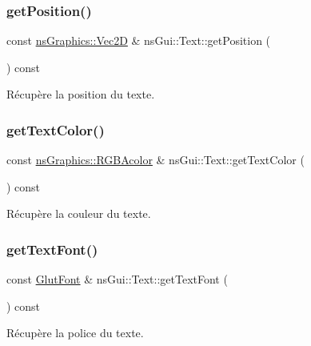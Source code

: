 \subsubsection{\texorpdfstring{get\+Position()}{getPosition()}}
{\footnotesize\ttfamily const \hyperlink{classns_graphics_1_1_vec2_d}{ns\+Graphics\+::\+Vec2D} \& ns\+Gui\+::\+Text\+::get\+Position (\begin{DoxyParamCaption}{ }\end{DoxyParamCaption}) const}



Récupère la position du texte. 

\mbox{\label{classns_gui_1_1_text_a248f06b3a9a85c05225449424311abd0}} 
\subsubsection{\texorpdfstring{get\+Text\+Color()}{getTextColor()}}
{\footnotesize\ttfamily const \hyperlink{classns_graphics_1_1_r_g_b_acolor}{ns\+Graphics\+::\+R\+G\+B\+Acolor} \& ns\+Gui\+::\+Text\+::get\+Text\+Color (\begin{DoxyParamCaption}{ }\end{DoxyParamCaption}) const}



Récupère la couleur du texte. 

\mbox{\label{classns_gui_1_1_text_af578710341d0afb6c593550cbc94ca64}} 
\subsubsection{\texorpdfstring{get\+Text\+Font()}{getTextFont()}}
{\footnotesize\ttfamily const \hyperlink{classns_gui_1_1_glut_font}{Glut\+Font} \& ns\+Gui\+::\+Text\+::get\+Text\+Font (\begin{DoxyParamCaption}{ }\end{DoxyParamCaption}) const}



Récupère la police du texte. 

\mbox{\label{classns_gui_1_1_text_a4e23cbbe0345c0742c228d3ab98967c5}} 
